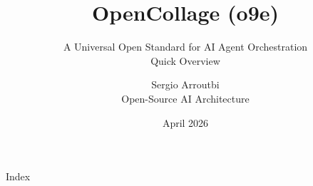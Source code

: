 \documentclass{beamer}
\title{OpenCollage (o9e)}
\subtitle{A Universal Open Standard for AI Agent Orchestration\\[4pt]
\normalsize Quick Overview}
\author{Sergio Arroutbi \\ Open-Source AI Architecture}
\date{April 2026}
\begin{document}
\begin{frame}
  \titlepage
\end{frame}

\begin{frame}{Index}
  \tiny
  \tableofcontents
\end{frame}










\end{document}
